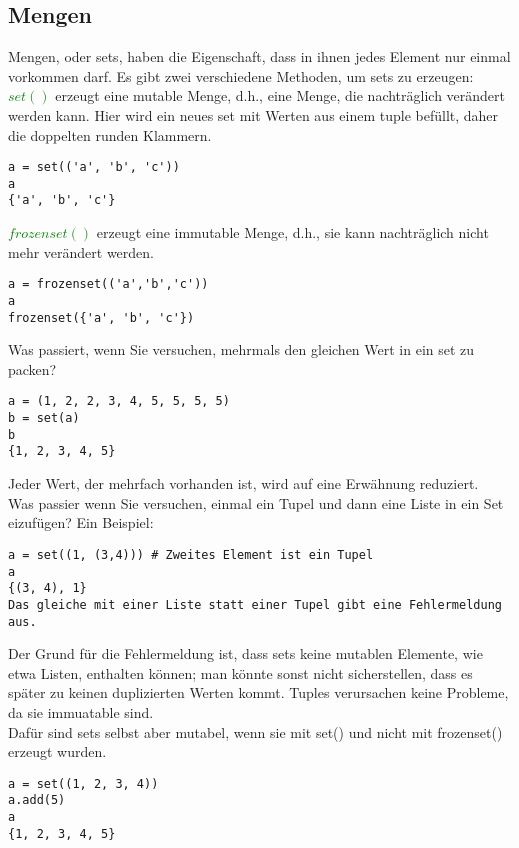 \documentclass{article}
\begin{document}
\newpage

\subsection{Mengen}
Mengen, oder sets, haben die Eigenschaft, dass in ihnen jedes Element nur einmal vorkommen darf. Es gibt zwei verschiedene Methoden, um sets zu erzeugen:\\
\textcolor{green}{$set()$} erzeugt eine mutable Menge, d.h., eine Menge, die nachträglich verändert werden kann. Hier wird ein neues set mit Werten aus einem tuple befüllt, daher die doppelten runden Klammern.\\
\begin{verbatim}
a = set(('a', 'b', 'c'))
a
{'a', 'b', 'c'}
\end{verbatim}
\textcolor{green}{$frozenset()$} erzeugt eine immutable Menge, d.h., sie kann nachträglich nicht mehr verändert werden.\\
\begin{verbatim}
a = frozenset(('a','b','c'))
a
frozenset({'a', 'b', 'c'})
\end{verbatim}
Was passiert, wenn Sie versuchen, mehrmals den gleichen Wert in ein set zu packen?
\begin{verbatim}
a = (1, 2, 2, 3, 4, 5, 5, 5, 5)
b = set(a)
b
{1, 2, 3, 4, 5}
\end{verbatim}
Jeder Wert, der mehrfach vorhanden ist, wird auf eine Erwähnung reduziert.\\
Was passier wenn Sie versuchen, einmal ein Tupel und dann eine Liste in ein Set eizufügen? Ein Beispiel:
\begin{verbatim}
a = set((1, (3,4))) # Zweites Element ist ein Tupel
a
{(3, 4), 1}
Das gleiche mit einer Liste statt einer Tupel gibt eine Fehlermeldung aus.
\end{verbatim}
Der Grund für die Fehlermeldung ist, dass sets keine mutablen Elemente, wie etwa Listen, enthalten können; man könnte sonst nicht sicherstellen, dass es später zu keinen duplizierten Werten kommt. Tuples verursachen keine Probleme, da sie immuatable sind.\\
Dafür sind sets selbst aber mutabel, wenn sie mit set() und nicht mit frozenset() erzeugt wurden.
\begin{verbatim}
a = set((1, 2, 3, 4))
a.add(5)
a
{1, 2, 3, 4, 5}
\end{verbatim}
\end{document}
